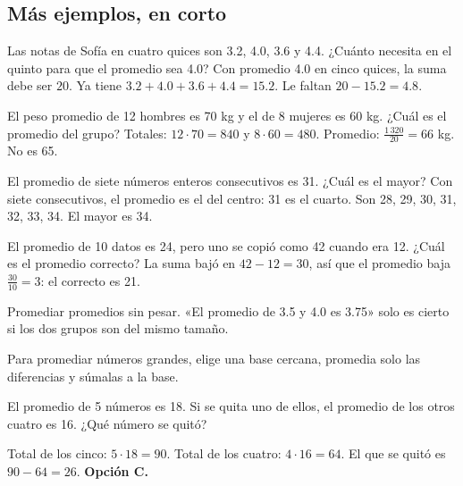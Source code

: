\subsection{Más ejemplos, en corto}
\begin{ejemplo}
Las notas de Sofía en cuatro quices son 3.2, 4.0, 3.6 y 4.4. ¿Cuánto necesita en el quinto para que el promedio sea 4.0?
\solucion Con promedio 4.0 en cinco quices, la suma debe ser $20$. Ya tiene $3.2 + 4.0 + 3.6 + 4.4 = 15.2$. Le faltan
$20 - 15.2 = 4.8$.
\end{ejemplo}

\begin{ejemplo}
El peso promedio de 12 hombres es 70 kg y el de 8 mujeres es 60 kg. ¿Cuál es el promedio del grupo?
\solucion Totales: $12 \cdot 70 = 840$ y $8 \cdot 60 = 480$. Promedio: $\tfrac{1\,320}{20} = 66$ kg. No es 65.
\end{ejemplo}

\begin{ejemplo}[Consecutivos]
El promedio de siete números enteros consecutivos es 31. ¿Cuál es el mayor?
\solucion Con siete consecutivos, el promedio es el del centro: 31 es el cuarto. Son 28, 29, 30, 31, 32, 33, 34. El
mayor es 34.
\end{ejemplo}

\begin{ejemplo}
El promedio de 10 datos es 24, pero uno se copió como 42 cuando era 12. ¿Cuál es el promedio correcto?
\solucion La suma bajó en $42 - 12 = 30$, así que el promedio baja $\tfrac{30}{10} = 3$: el correcto es 21.
\end{ejemplo}

\begin{trampa}
Promediar promedios sin pesar. «El promedio de 3.5 y 4.0 es 3.75» solo es cierto si los dos grupos son del mismo tamaño.
\end{trampa}

\begin{atajo}
Para promediar números grandes, elige una base cercana, promedia solo las diferencias y súmalas a la base.
\end{atajo}

\begin{reto}
El promedio de 5 números es 18. Si se quita uno de ellos, el promedio de los otros cuatro es 16. ¿Qué número se quitó?
\end{reto}

\begin{retoresuelto}
Total de los cinco: $5 \cdot 18 = 90$. Total de los cuatro: $4 \cdot 16 = 64$. El que se quitó es $90 - 64 = 26$.
\textbf{Opción C.}
\end{retoresuelto}


